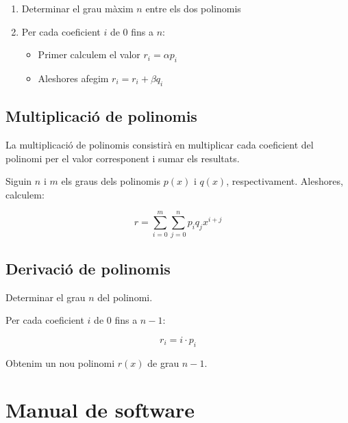 \documentclass[12pt,twoside,a4paper]{article}
\begin{document}
\begin{tcolorbox}[
title=\textbf{Algoritme:} Per calcular una combinació lineal $\alpha p(x) + \beta q(x)$,colback=red!5!white,colframe=red!75!black]
\begin{enumerate}
    \item Determinar el grau màxim $n$ entre els dos polinomis
    \item Per cada coeficient $i$ de 0 fins a $n$:
    \begin{itemize}
        \item Primer calculem el valor $r_i = \alpha p_i$
        \item Aleshores afegim $r_i = r_i + \beta q_i$
    \end{itemize}
\end{enumerate}
\end{tcolorbox}

\subsection{Multiplicació de polinomis}
La multiplicació de polinomis consistirà en multiplicar cada coeficient del polinomi per el valor corresponent i sumar els resultats.

\begin{tcolorbox}[
title=\textbf{Algoritme:} Per multiplicar dos polinomis $p(x)$ i $q(x)$,colback=blue!5!white,colframe=blue!75!black]
Siguin $n$ i $m$ els graus dels polinomis $p(x)$ i $q(x)$, respectivament. Aleshores, calculem:

$$r = \sum_{i = 0}^m \sum_{j = 0}^n p_i q_j x^{i+j}$$
\end{tcolorbox}

\subsection{Derivació de polinomis}
\begin{tcolorbox}[
title=\textbf{Algoritme:} Per derivar un polinomi $p(x)$,colback=green!5!white,colframe=green!75!black]
Determinar el grau $n$ del polinomi.

Per cada coeficient $i$ de 0 fins a $n-1$:

$$r_i = i \cdot p_i$$

Obtenim un nou polinomi $r(x)$ de grau $n-1$.
\end{tcolorbox}

\newpage

\section{Manual de software}
\end{document}
